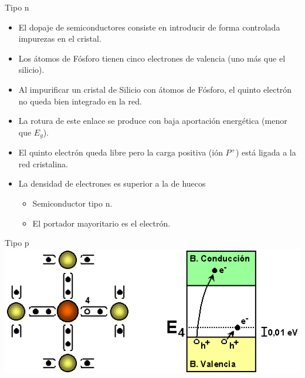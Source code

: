 \documentclass[xcolor={usenames,svgnames,dvipsnames}]{beamer}
\begin{document}
\begin{frame}[label=sec-1-3-3]{Tipo n}
\begin{itemize}
\item El \alert{dopaje de semiconductores} consiste en introducir de forma
controlada impurezas en el cristal.

\item Los átomos de \alert{Fósforo} tienen cinco electrones de valencia (uno más
que el silicio).

\item Al impurificar un cristal de Silicio con átomos de Fósforo, el quinto
electrón no queda bien integrado en la red.

\item La rotura de este enlace se produce con \alert{baja aportación energética}
   (menor que $E_{g}$).

\item El \alert{quinto electrón queda libre pero la carga positiva (ión $P^{+}$)
está ligada} a la red cristalina.

\item La \alert{densidad de electrones es superior a la de huecos}

\begin{itemize}
\item Semiconductor \alert{tipo n}.

\item El \alert{portador mayoritario} es el \alert{electrón}.
\end{itemize}
\end{itemize}
\end{frame}

\begin{frame}[label=sec-1-3-4]{Tipo p}
\includegraphics[width=.9\linewidth]{../figs/Semiconductor_tipo_p.png}
\end{frame}
\end{document}
